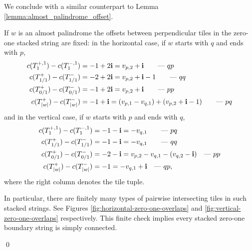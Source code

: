 \documentclass[12pt]{amsart}
\begin{document}
We conclude with a similar counterpart to Lemma \ref{lemma:almost_palindrome_offset}. 
\begin{lemma} \label{lemma:zero-one-fixed-offsets}
	If $w$ is an almost palindrome the offsets 
	between perpendicular tiles in the zero-one stacked string are fixed: in the horizontal case, if $w$ starts with $q$ and ends with $p$,
	\begin{align*}
	c(T_1^{+,1}) - c(T_1^{-,1})  &=   -1 + 2 \mathbf{i}  = v_{p,2} + \mathbf{i} \qquad \mbox{--- $qp$} \\
	c(T_{1/1}^+) - c(T_{1/1}^-) &=  -2 + 2 \mathbf{i} = v_{p,2} + \mathbf{i}-1  \qquad \mbox{--- $qq$} \\
	c(T_{0/1}^+) - c(T_{0/1}^-) &= -1 + 2 \mathbf{i} = v_{p,2} + \mathbf{i} \qquad \mbox{--- $pp$} \\
	c(T_{|w|}^+) - c(T_{|w|}^-) &= -1 + \mathbf{i}   = (v_{p,1} -v_{q,1}) + (v_{p,2} + \mathbf{i} -1) \qquad \mbox{--- $pq$}
	\end{align*}
	and in the vertical case, if $w$ starts with $p$ and ends with $q$, 
	\begin{align*}
	c(T_1^{+,1})-c(T_1^{-,1}) &=   -1 - \mathbf{i} = -v_{q,1} \qquad \mbox{--- $pq$}  \\
	c(T_{1/1}^+) - c(T_{1/1}^-) &= -1 - \mathbf{i}  = -v_{q,1} \qquad \mbox{--- $qq$} \\
	c(T_{0/1}^+) - c(T_{0/1}^-) &= -2 - \mathbf{i} = v_{p,2} - v_{q,1} - (v_{q,2}-\mathbf{i})  \quad \mbox{--- $pp$} \\
	c(T_{|w|}^+) - c(T_{|w|}^-) &= -1 = -v_{q,1} + \mathbf{i} \quad \mbox{--- $qp$},
	\end{align*}
	where the right column denotes the tile tuple.

	In particular, there are finitely many types of pairwise intersecting tiles in such stacked strings. See  Figures \ref{fig:horizontal-zero-one-overlaps} and \ref{fig:vertical-zero-one-overlaps} respectively. 
	This finite check implies every stacked zero-one boundary string is simply connected. 
\end{lemma}
\qed
\iffalse
\end{document}
